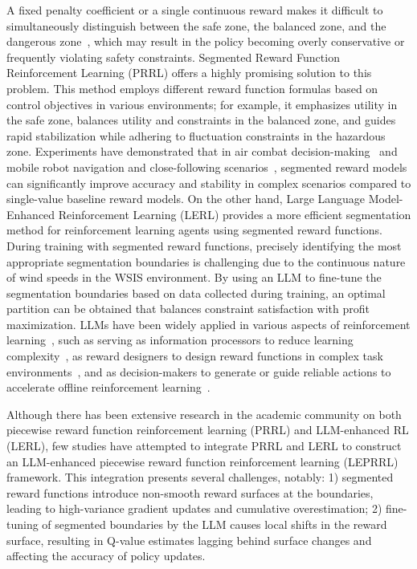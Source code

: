 \documentclass[lettersize,journal]{IEEEtran}
\begin{document}
A fixed penalty coefficient or a single continuous reward makes it difficult to simultaneously distinguish between the safe zone, the balanced zone, and the dangerous zone~\cite{ref17}, which may result in the policy becoming overly conservative or frequently violating safety constraints. Segmented Reward Function Reinforcement Learning (PRRL) offers a highly promising solution to this problem. This method employs different reward function formulas based on control objectives in various environments; for example, it emphasizes utility in the safe zone, balances utility and constraints in the balanced zone, and guides rapid stabilization while adhering to fluctuation constraints in the hazardous zone. Experiments have demonstrated that in air combat decision-making~\cite{ref18} and mobile robot navigation and close-following scenarios~\cite{ref19}, segmented reward models can significantly improve accuracy and stability in complex scenarios compared to single-value baseline reward models. On the other hand, Large Language Model-Enhanced Reinforcement Learning (LERL) provides a more efficient segmentation method for reinforcement learning agents using segmented reward functions. During training with segmented reward functions, precisely identifying the most appropriate segmentation boundaries is challenging due to the continuous nature of wind speeds in the WSIS environment. By using an LLM to fine-tune the segmentation boundaries based on data collected during training, an optimal partition can be obtained that balances constraint satisfaction with profit maximization. LLMs have been widely applied in various aspects of reinforcement learning~\cite{ref20}, such as serving as information processors to reduce learning complexity~\cite{ref21}, as reward designers to design reward functions in complex task environments~\cite{ref22}, and as decision-makers to generate or guide reliable actions to accelerate offline reinforcement learning~\cite{ref23}.

Although there has been extensive research in the academic community on both piecewise reward function reinforcement learning (PRRL) and LLM-enhanced RL (LERL), few studies have attempted to integrate PRRL and LERL to construct an LLM-enhanced piecewise reward function reinforcement learning (LEPRRL) framework. This integration presents several challenges, notably: 1) segmented reward functions introduce non-smooth reward surfaces at the boundaries, leading to high-variance gradient updates and cumulative overestimation; 2) fine-tuning of segmented boundaries by the LLM causes local shifts in the reward surface, resulting in Q-value estimates lagging behind surface changes and affecting the accuracy of policy updates.
\end{document}
